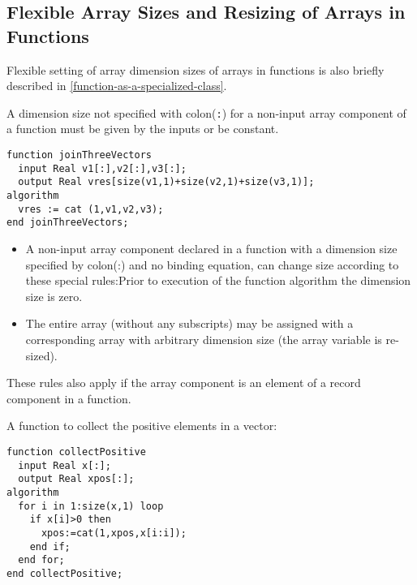 \subsection{Flexible Array Sizes and Resizing of Arrays in Functions}

\begin{nonnormative}
Flexible setting of array dimension sizes of arrays in
functions is also briefly described in \autoref{function-as-a-specialized-class}.
\end{nonnormative}

A dimension size not specified with colon(\lstinline!:!) for a non-input array
component of a function must be given by the inputs or be constant.

\begin{example}
\begin{lstlisting}[language=modelica]
function joinThreeVectors
  input Real v1[:],v2[:],v3[:];
  output Real vres[size(v1,1)+size(v2,1)+size(v3,1)];
algorithm
  vres := cat (1,v1,v2,v3);
end joinThreeVectors;
\end{lstlisting}
\end{example}

\begin{itemize}
\item
  A non-input array component declared in a function with a dimension
  size specified by colon(:) and no binding equation, can change
  size according to these special rules:Prior to execution of the
  function algorithm the dimension size is zero.
\item
  The entire array (without any subscripts) may be assigned with a
  corresponding array with arbitrary dimension size (the array variable
  is re-sized).
\end{itemize}

These rules also apply if the array component is an element of a record
component in a function.

\begin{example}
A function to collect the positive elements in a vector:
\begin{lstlisting}[language=modelica]
function collectPositive
  input Real x[:];
  output Real xpos[:];
algorithm
  for i in 1:size(x,1) loop
    if x[i]>0 then
      xpos:=cat(1,xpos,x[i:i]);
    end if;
  end for;
end collectPositive;
\end{lstlisting}
\end{example}

